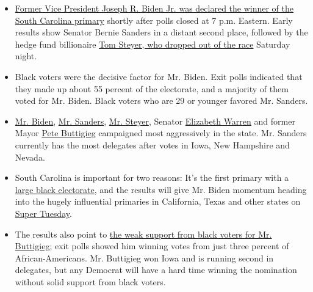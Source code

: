 \begin{itemize}
\item
  \href{https://www.nytimes3xbfgragh.onion/2020/02/29/us/politics/joe-biden-south-carolina-primary.html}{Former
  Vice President Joseph R. Biden Jr. was declared the winner of the
  South Carolina primary} shortly after polls closed at 7 p.m. Eastern.
  Early results show Senator Bernie Sanders in a distant second place,
  followed by the hedge fund billionaire
  \href{http://www.nytimes3xbfgragh.onion/2020/02/29/us/politics/tom-steyer-drops-out.html}{Tom
  Steyer, who dropped out of the race} Saturday night.
\item
  Black voters were the decisive factor for Mr. Biden. Exit polls
  indicated that they made up about 55 percent of the electorate, and a
  majority of them voted for Mr. Biden. Black voters who are 29 or
  younger favored Mr. Sanders.
\item
  \href{https://www.nytimes3xbfgragh.onion/interactive/2020/us/elections/joe-biden.html}{Mr.
  Biden},
  \href{https://www.nytimes3xbfgragh.onion/interactive/2020/us/elections/bernie-sanders.html}{Mr.
  Sanders},
  \href{https://www.nytimes3xbfgragh.onion/2020/02/28/us/politics/tom-steyer-south-carolina-campaign-spending.html}{Mr.
  Steyer}, Senator
  \href{https://www.nytimes3xbfgragh.onion/interactive/2020/us/elections/elizabeth-warren.html}{Elizabeth
  Warren} and former Mayor
  \href{https://www.nytimes3xbfgragh.onion/interactive/2020/us/elections/pete-buttigieg.html}{Pete
  Buttigieg} campaigned most aggressively in the state. Mr. Sanders
  currently has the most delegates after votes in Iowa, New Hampshire
  and Nevada.
\item
  South Carolina is important for two reasons: It's the first primary
  with a
  \href{https://www.nytimes3xbfgragh.onion/2020/02/29/us/politics/black-voters-south-carolina-primary.html}{large
  black electorate}, and the results will give Mr. Biden momentum
  heading into the hugely influential primaries in California, Texas and
  other states on
  \href{https://www.nytimes3xbfgragh.onion/2020/02/28/us/politics/latest-democratic-polls.html}{Super
  Tuesday}.
\item
  The results also point to
  \href{https://www.nytimes3xbfgragh.onion/2020/02/29/us/politics/buttigieg-black-voters-south-carolina.html}{the
  weak support from black voters for Mr. Buttigieg}; exit polls showed
  him winning votes from just three percent of African-Americans. Mr.
  Buttigieg won Iowa and is running second in delegates, but any
  Democrat will have a hard time winning the nomination without solid
  support from black voters.
\end{itemize}

